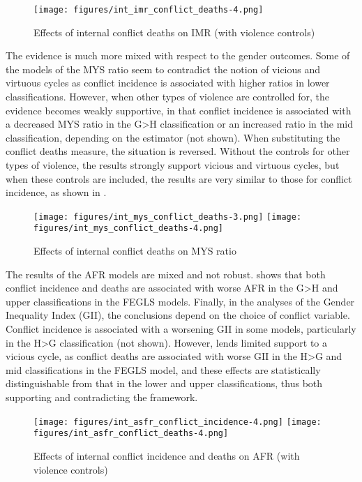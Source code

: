 \documentclass[12pt]{article}
\begin{document}
\begin{figure}[!htb]
    \centering
    \caption{Effects of internal conflict deaths on IMR (with violence controls)}
    \label{int_imr_conflict_deaths}
    \texttt{[image: figures/int\_imr\_conflict\_deaths-4.png]}
\end{figure}

The evidence is much more mixed with respect to the gender outcomes.
Some of the models of the MYS ratio seem to contradict the notion of vicious and virtuous cycles as conflict incidence is associated with higher ratios in lower classifications.
However, when other types of violence are controlled for, the evidence becomes weakly supportive, in that conflict incidence is associated with a decreased MYS ratio in the G>H classification or an increased ratio in the mid classification, depending on the estimator (not shown).
When substituting the conflict deaths measure, the situation is reversed. Without the controls for other types of violence, the results strongly support vicious and virtuous cycles, but when these controls are included, the results are very similar to those for conflict incidence, as shown in .

\begin{figure}[!htb]
    \centering
    \caption{Effects of internal conflict deaths on MYS ratio}
    \label{int_mys_conflict_deaths}
    \texttt{[image: figures/int\_mys\_conflict\_deaths-3.png]}
    \texttt{[image: figures/int\_mys\_conflict\_deaths-4.png]}
\end{figure}

The results of the AFR models are mixed and not robust.
 shows that both conflict incidence and deaths are associated with worse AFR in the G>H and upper classifications in the FEGLS models.
Finally, in the analyses of the Gender Inequality Index (GII), the conclusions depend on the choice of conflict variable. Conflict incidence is associated with a worsening GII in some models, particularly in the H>G classification (not shown).
However,  lends limited support to a vicious cycle, as conflict deaths are associated with worse GII in the H>G and mid classifications in the FEGLS model, and these effects are statistically distinguishable from that in the lower and upper classifications, thus both supporting and contradicting the framework.

\begin{figure}[!htb]
    \centering
    \caption{Effects of internal conflict incidence and deaths on AFR (with violence controls)}
    \label{int_asfr_conflict}
    \texttt{[image: figures/int\_asfr\_conflict\_incidence-4.png]}
    \texttt{[image: figures/int\_asfr\_conflict\_deaths-4.png]}
\end{figure}
\end{document}

